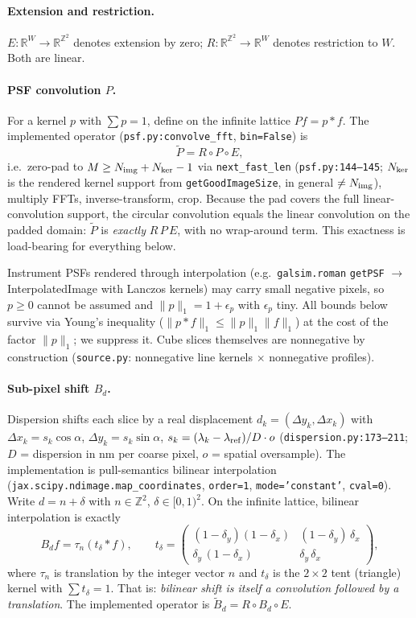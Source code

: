 \documentclass[11pt]{article}
\newcommand{\R}{\mathbb{R}}
\newcommand{\Z}{\mathbb{Z}}
\newcommand{\conv}{\ast}
\newcommand{\code}[1]{\texttt{#1}}
\begin{document}
\paragraph{Extension and restriction.} $E : \R^W \to \R^{\Z^2}$ denotes
extension by zero; $R : \R^{\Z^2} \to \R^W$ denotes restriction to $W$. Both
are linear.

\paragraph{PSF convolution $P$.} For a kernel $p$ with $\sum p = 1$,
define on the infinite lattice $P f = p \conv f$. The implemented operator
(\code{psf.py:convolve\_fft}, \code{bin=False}) is
\[
\tilde P = R \circ P \circ E ,
\]
i.e.\ zero-pad to $M \ge N_{\rm img} + N_{\rm ker} - 1$ via
\code{next\_fast\_len} (\code{psf.py:144--145}; $N_{\rm ker}$ is the
rendered kernel support from \code{getGoodImageSize}, in general
$\ne N_{\rm img}$), multiply FFTs, inverse-transform, crop. Because the pad
covers the full linear-convolution support, the circular convolution equals
the linear convolution on the padded domain: $\tilde P$ is \emph{exactly}
$R\,P\,E$, with no wrap-around term. This exactness is load-bearing for
everything below.

Instrument PSFs rendered through interpolation (e.g.\ \code{galsim.roman}
\code{getPSF} $\to$ InterpolatedImage with Lanczos kernels) may carry small
negative pixels, so $p \ge 0$ cannot be assumed and $\|p\|_1 = 1 +
\epsilon_p$ with $\epsilon_p$ tiny. All bounds below survive via Young's
inequality ($\|p \conv f\|_1 \le \|p\|_1 \|f\|_1$) at the cost of the
factor $\|p\|_1$; we suppress it. Cube slices themselves are nonnegative by
construction (\code{source.py}: nonnegative line kernels $\times$
nonnegative profiles).

\paragraph{Sub-pixel shift $B_d$.} Dispersion shifts each slice by a real
displacement $d_k = (\Delta y_k, \Delta x_k)$ with
$\Delta x_k = s_k \cos\alpha$, $\Delta y_k = s_k \sin\alpha$,
$s_k = (\lambda_k - \lambda_{\rm ref})/D \cdot o$ (\code{dispersion.py:173--211};
$D$ = dispersion in nm per coarse pixel, $o$ = spatial oversample). The
implementation is pull-semantics bilinear interpolation
(\code{jax.scipy.ndimage.map\_coordinates}, \code{order=1},
\code{mode='constant'}, \code{cval=0}). Write $d = n + \delta$ with
$n \in \Z^2$, $\delta \in [0,1)^2$. On the infinite lattice, bilinear
interpolation is exactly
\[
B_d f = \tau_n\!\left( t_\delta \conv f \right),
\qquad
t_\delta = \begin{pmatrix}
(1-\delta_y)(1-\delta_x) & (1-\delta_y)\,\delta_x\\
\delta_y\,(1-\delta_x) & \delta_y\,\delta_x
\end{pmatrix},
\]
where $\tau_n$ is translation by the integer vector $n$ and $t_\delta$ is the
$2\times2$ tent (triangle) kernel with $\sum t_\delta = 1$. That is:
\emph{bilinear shift is itself a convolution followed by a translation}. The
implemented operator is $\tilde B_d = R \circ B_d \circ E$.
\end{document}
